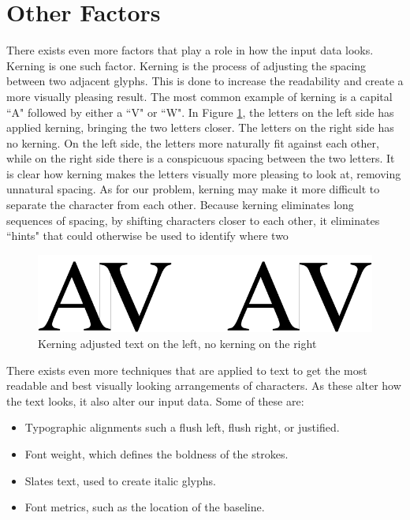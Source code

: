 
\section{Other Factors}
There exists even more factors that play a role in how the input data looks. Kerning is one such factor. Kerning is the process of adjusting the spacing between two adjacent glyphs. This is done to increase the readability and create a more visually pleasing result. The most common example of kerning is a capital ``A" followed by either a ``V" or ``W". In Figure \ref{fig:kerning-comparison}, the letters on the left side has applied kerning, bringing the two letters closer. The letters on the right side has no kerning. On the left side, the letters more naturally fit against each other, while on the right side there is a conspicuous spacing between the two letters. It is clear how kerning makes the letters visually more pleasing to look at, removing unnatural spacing. As for our problem, kerning may make it more difficult to separate the character from each other. Because kerning eliminates long sequences of spacing, by shifting characters closer to each other, it eliminates ``hints" that could otherwise be used to identify where two 

\begin{figure}[ht]
    \centering
    \includegraphics[width=1.0\textwidth]{fig/chapter2/kerning.png}
    \caption{Kerning adjusted text on the left, no kerning on the right}
    \label{fig:kerning-comparison}
\end{figure}

There exists even more techniques that are applied to text to get the most readable and best visually looking arrangements of characters. As these alter how the text looks, it also alter our input data. Some of these are:

\begin{itemize}
    \item Typographic alignments such a flush left, flush right, or justified.
    \item Font weight, which defines the boldness of the strokes.
    \item Slates text, used to create italic glyphs.
    \item Font metrics, such as the location of the baseline.
\end{itemize}


